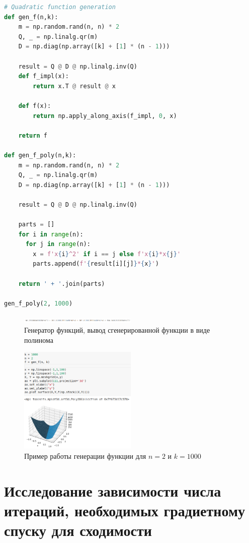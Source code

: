\begin{lstlisting}[language=Python]
# Quadratic function generation
def gen_f(n,k):
    m = np.random.rand(n, n) * 2
    Q, _ = np.linalg.qr(m)
    D = np.diag(np.array([k] + [1] * (n - 1)))

    result = Q @ D @ np.linalg.inv(Q)
    def f_impl(x):
        return x.T @ result @ x

    def f(x):
        return np.apply_along_axis(f_impl, 0, x)
        
    return f

def gen_f_poly(n,k):
    m = np.random.rand(n, n) * 2
    Q, _ = np.linalg.qr(m)
    D = np.diag(np.array([k] + [1] * (n - 1)))

    result = Q @ D @ np.linalg.inv(Q)
    
    parts = []
    for i in range(n):
      for j in range(n):
        x = f'x{i}^2' if i == j else f'x{i}*x{j}'
        parts.append(f'{result[i][j]}*{x}')

    return ' + '.join(parts)

gen_f_poly(2, 1000)
\end{lstlisting}

\begin{figure}[ht]
    \centering
    \includegraphics[width=0.5\textwidth]{images/gen1.png}
    \caption{Генератор функций, вывод сгенерированной функции в виде полинома}
    \label{fig:gen1}
\end{figure}

\begin{figure}[ht]
    \centering
    \includegraphics[width=0.5\textwidth]{images/gen2.png}
    \caption{Пример работы генерации функции для $n=2$ и $k=1000$}
    \label{fig:gen2}
\end{figure}

\section{Исследование зависимости числа итераций, необходимых градиетному спуску для сходимости}

